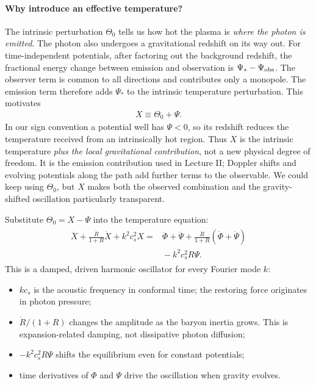 \documentclass[12pt]{article}
\newcommand{\be}{\begin{eqnarray}}
\newcommand{\ee}{\end{eqnarray}}
\begin{document}
\paragraph{Why introduce an effective temperature?}
The intrinsic perturbation $\Theta_0$ tells us how hot the plasma is \emph{where the
photon is emitted}. The photon also undergoes a gravitational redshift on its way
out. For time-independent potentials, after factoring out the background redshift,
the fractional energy change between emission and observation is
$\Psi_*-\Psi_{\rm obs}$. The observer term is common to all directions and contributes
only a monopole. The emission term therefore adds $\Psi_*$ to the intrinsic
temperature perturbation. This motivates
\be
X\equiv\Theta_0+\Psi.
\ee
In our sign convention a potential well has $\Psi<0$, so its redshift reduces the
temperature received from an intrinsically hot region. Thus $X$ is the intrinsic
temperature \emph{plus the local gravitational contribution}, not a new physical
degree of freedom. It is the emission contribution used in Lecture II; Doppler
shifts and evolving potentials along the path add further terms to the observable.
We could keep using $\Theta_0$, but $X$ makes both the observed combination and the
gravity-shifted oscillation particularly transparent.

Substitute $\Theta_0=X-\Psi$ into the temperature equation:
\be
\boxed{
\begin{aligned}
\ddot X+\frac{\dot R}{1+R}\dot X+k^2c_s^2X
={}&\ddot\Phi+\ddot\Psi
+\frac{\dot R}{1+R}(\dot\Phi+\dot\Psi)\\
&{}-k^2c_s^2R\Psi.
\end{aligned}}
\label{eq:oscillator}
\ee
This is a damped, driven harmonic oscillator for every Fourier mode $k$:
\begin{itemize}
\item $kc_s$ is the acoustic frequency in conformal time; the restoring force
originates in photon pressure;
\item $\dot R/(1+R)$ changes the amplitude as the baryon inertia grows. This is
expansion-related damping, not dissipative photon diffusion;
\item $-k^2c_s^2R\Psi$ shifts the equilibrium even for constant potentials;
\item time derivatives of $\Phi$ and $\Psi$ drive the oscillation when gravity evolves.
\end{itemize}
\end{document}
